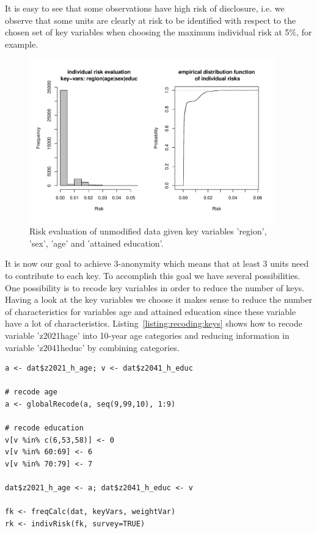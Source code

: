 \documentclass[12pt]{article}
\begin{document}
It is easy to see that some observations have high risk of disclosure, i.e. 
we observe that some units are clearly at risk to be identified with respect to
the chosen set of key variables when choosing the maximum individual risk at 5\%, for example.


\begin{figure}
	\centering
	\includegraphics[width=0.95\textwidth]{risk1}
	\caption{Risk evaluation of unmodified data given key variables 'region', 'sex', 'age' and 'attained education'.}
	\label{graph:risk1}
\end{figure}

It is now our goal to achieve 3-anonymity which means that at least 3 units need to contribute to each key. 
To accomplish this goal we have several possibilities. One possibility is to recode key variables in order to 
reduce the number of keys. Having a look at the key variables we choose it makes sense to reduce the number 
of characteristics for variables age and attained education since these variable have a lot of
 characteristics. Listing~\ref{listing:recoding:keys} shows how to recode variable 
 'z2021\textunderscore h\textunderscore age' into 10-year age categories and reducing information 
 in variable 'z2041\textunderscore h\textunderscore educ' by combining categories.

\begin{lstlisting}[captionpos=b, caption={Recoding of key variables}, label=listing:recoding:keys]
a <- dat$z2021_h_age; v <- dat$z2041_h_educ

# recode age
a <- globalRecode(a, seq(9,99,10), 1:9) 

# recode education
v[v %in% c(6,53,58)] <- 0
v[v %in% 60:69] <- 6
v[v %in% 70:79] <- 7

dat$z2021_h_age <- a; dat$z2041_h_educ <- v	

fk <- freqCalc(dat, keyVars, weightVar)
rk <- indivRisk(fk, survey=TRUE)
\end{lstlisting}
\end{document}
